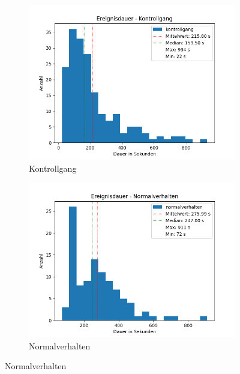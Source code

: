 \begin{figure}[htbp]
    \centering
    \begin{subfigure}{.5\textwidth}
        \centering
        \includegraphics[width=1.1\linewidth]{img//Ereignisdauer/Auswertung Ereignisdauer kontrollgang.png}
        \caption{Kontrollgang}
        \label{fig:DauerKontroll}
    \end{subfigure}%
    \begin{subfigure}{.5\textwidth}
        \centering
        \includegraphics[width=1.1\linewidth]{img//Ereignisdauer/Auswertung Ereignisdauer normalverhalten.png}
        \caption{Normalverhalten}
        \label{fig:DauerKampf}
    \end{subfigure}

\end{figure}
